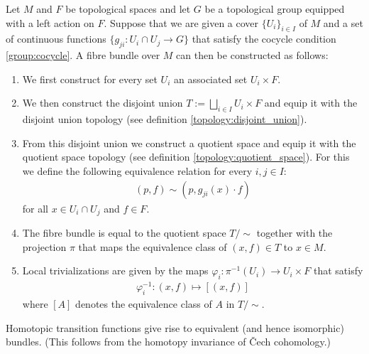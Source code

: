     \begin{construct}\label{manifolds:theorem:fibre_bundle_construction_theorem}
        Let $M$ and $F$ be topological spaces and let $G$ be a topological group equipped with a left action on $F$. Suppose that we are given a cover $\{U_i\}_{i\in I}$ of $M$ and a set of continuous functions $\{g_{ji}:U_i\cap U_j\rightarrow G\}$ that satisfy the cocycle condition \ref{group:cocycle}. A fibre bundle over $M$ can then be constructed as follows:
        \begin{enumerate}
            \item We first construct for every set $U_i$ an associated set $U_i\times F$.
            \item We then construct the disjoint union $T:=\bigsqcup_{i\in I}U_i\times F$ and equip it with the disjoint union topology (see definition \ref{topology:disjoint_union}).
            \item From this disjoint union we construct a quotient space and equip it with the quotient space topology (see definition \ref{topology:quotient_space}). For this we define the following equivalence relation for every $i, j\in I$:
                \begin{gather}
                    (p, f)\sim(p, g_{ji}(x)\cdot f)
                \end{gather}
                for all $x\in U_i\cap U_j$ and $f\in F$.
            \item The fibre bundle is equal to the quotient space $T/\sim$ together with the projection $\pi$ that maps the equivalence class of $(x, f)\in T$ to $x\in M$.
            \item Local trivializations are given by the maps $\varphi_i:\pi^{-1}(U_i)\rightarrow U_i\times F$ that satisfy
                \begin{gather}
                    \varphi_i^{-1}:(x, f)\mapsto [(x, f)]
                \end{gather}
                where $[A]$ denotes the equivalence class of $A$ in $T/\sim$.
        \end{enumerate}
    \end{construct}
    \begin{property}
        Homotopic transition functions give rise to equivalent (and hence isomorphic) bundles. (This follows from the homotopy invariance of \v{C}ech cohomology.)
    \end{property}

